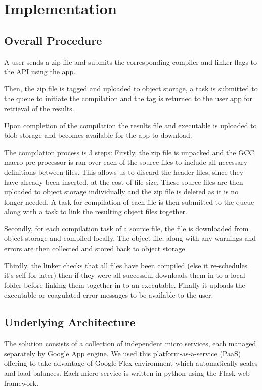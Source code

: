 \documentclass[conference]{IEEEtran}
\begin{document}

\section{Implementation}
\subsection{Overall Procedure}
A user sends a zip file and submits the corresponding compiler and linker
flags to the API using the app.

Then, the zip file is tagged and uploaded to object storage, a task is submitted to the queue to initiate the compilation and the tag is returned to the user app for retrieval of the results.

Upon completion of the compilation the results file and executable is uploaded to blob storage and becomes available for the app to download.

The compilation process is 3 steps:
Firstly, the zip file is unpacked and the GCC macro pre-processor is ran over each of
the source files to include all necessary definitions between files. This allows us to discard the header files, since they have already been inserted, at the cost of file size. These source files are then uploaded to object storage individually and the zip file is deleted as it is no longer needed. A task for compilation of each file is then submitted to the queue along with a task to link the resulting object files together. 

Secondly, for each compilation task of a source file, the file is downloaded from object storage and compiled locally. The object file, along with any warnings and errors are then collected and stored back to object storage.

Thirdly, the linker checks that all files have been compiled (else it re-schedules it's self for later) then if they were all successful downloads them in to a local folder before linking them together in to an executable. Finally it uploads the executable or coagulated error messages to be available to the user.

\subsection{Underlying Architecture}

The solution consists of a collection of independent micro services, each managed separately by Google App engine. We used this platform-as-a-service (PaaS) offering to take advantage of Google Flex environment which automatically scales and load balances. Each micro-service is written in python using the Flask web framework\cite{Flask}. 
\end{document}
